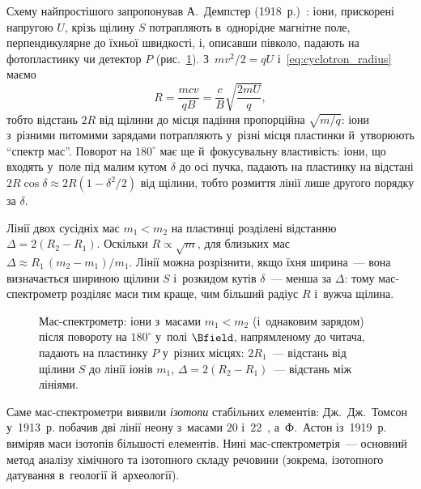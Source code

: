 Схему найпростішого  запропонував А.~Демпстер (1918~р.)~\cite{Dempster1918}: іони, прискорені напругою $U$, крізь
щілину $S$ потрапляють в~однорідне магнітне поле, перпендикулярне до їхньої швидкості, і, описавши півколо, падають на фотопластинку
чи детектор $P$ (рис.~\ref{tikz:mass_spectrometer}). З~$mv^2/2 = qU$ і~\eqref{eq:cyclotron_radius} маємо
\begin{equation}\label{eq:mass_spectrometer}
	R = \frac{mcv}{qB} = \frac{c}{B}\sqrt{\frac{2mU}{q}},
\end{equation}
тобто відстань $2R$ від щілини до місця падіння пропорційна $\sqrt{m/q}$: іони з~різними питомими зарядами потрапляють у~різні місця
пластинки й~утворюють \enquote{спектр мас}. Поворот на $180^\circ$ має ще й~фокусувальну властивість: іони, що входять у~поле під малим
кутом $\delta$ до осі пучка, падають на пластинку на відстані $2R\cos\delta\approx2R(1-\delta^2/2)$ від щілини, тобто розмиття лінії
лише другого порядку за $\delta$.

Лінії двох сусідніх мас $m_1<m_2$ на пластинці розділені відстанню $\Delta = 2(R_2-R_1)$. Оскільки $R\propto\sqrt{m}$, для близьких
мас $\Delta \approx R_1\,(m_2-m_1)/m_1$. Лінії можна розрізнити, якщо їхня ширина~--- вона визначається шириною щілини $S$ і~розкидом кутів
$\delta$~--- менша за $\Delta$: тому мас-спектрометр розділяє маси тим краще, чим більший радіус $R$ і~вужча щілина.

\begin{figure}[h!]
	\centering
	\caption{Мас-спектрометр: іони з~масами $m_1<m_2$ (і~однаковим зарядом) після повороту на $180^\circ$ у~полі $\Bfield$, напрямленому
		до читача, падають на пластинку $P$ у~різних місцях: $2R_1$~--- відстань від щілини $S$ до лінії іонів $m_1$,
		$\Delta = 2(R_2-R_1)$~--- відстань між лініями.}
	\label{tikz:mass_spectrometer}
\end{figure}

Саме мас-спектрометри виявили \emph{ізотопи} стабільних елементів: Дж.~Дж.~Томсон у~1913~р. побачив дві лінії неону з~масами $20$ і~$22$~\cite{Thomson1913},
а~Ф.~Астон із~1919~р.~\cite{Aston1919} виміряв маси ізотопів більшості елементів. Нині мас-спектрометрія~--- основний метод аналізу хімічного та
ізотопного складу речовини (зокрема, ізотопного датування в~геології й~археології).


